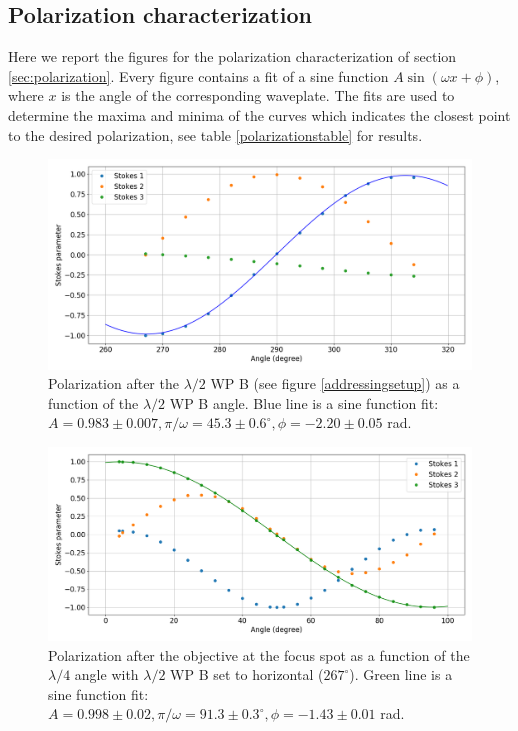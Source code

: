 \documentclass[english, a4paper, 12pt, twoside]{book}
\numberwithin{equation}{section} %
\begin{document}
\begin{appendices}
\chapter{Polarization characterization}
\label{app:polarization}
Here we report the figures for the polarization characterization of section \ref{sec:polarization}. Every figure contains a fit of a sine function $A\sin(\omega x +\phi)$, where $x$ is the angle of the corresponding waveplate. The fits are used to determine the maxima and minima of the curves which indicates the closest point to the desired polarization, see table \ref{polarizationstable} for results.
\begin{figure}[H]
\centering
\includegraphics[width = \textwidth]{pol3}
\caption{Polarization after the $\lambda/2$ WP B (see figure \ref{addressingsetup}) as a function of the $\lambda/2$ WP B angle. Blue line is a sine function fit: $A = 0.983 \pm 0.007, \pi/\omega = 45.3 \pm 0.6^\circ, \phi = -2.20\pm0.05$ rad.}
\label{pol1}
\end{figure}
\begin{figure}[H]
\centering
\includegraphics[width = \textwidth]{pol1}
\caption{Polarization after the objective at the focus spot as a function of the $\lambda/4$ angle with $\lambda/2$ WP B set to horizontal ($267^\circ$). Green line is a sine function fit: $A = 0.998\pm 0.02, \pi/\omega = 91.3\pm0.3^\circ, \phi = -1.43\pm0.01$ rad.}

\end{figure}
\end{appendices}
\end{document}
